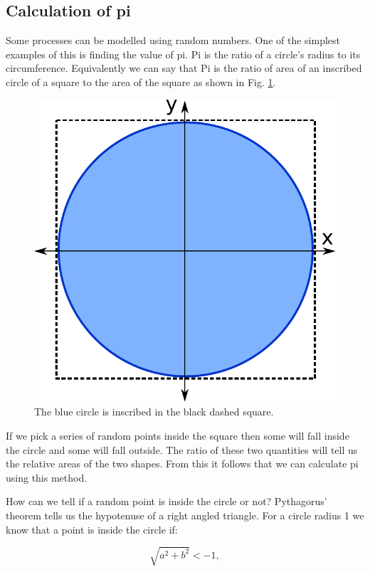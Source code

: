 	\subsection{Calculation of pi}
		Some processes can be modelled using random numbers. One of the simplest examples of this is finding the value of pi. Pi is the ratio of a circle's radius to its circumference. Equivalently we can say that Pi is the ratio of area of an inscribed circle of a square to the area of the square as shown in Fig. \ref{fig:picircle}. 
	\begin{figure}[h]
		\centering
		\includegraphics[scale=0.4]{images/pi}
		\caption{The blue circle is inscribed in the black dashed square.}
		\label{fig:picircle}
	\end{figure}

	If we pick a series of random points inside the square then some will fall inside the circle and some will fall outside. The ratio of these two quantities will tell us the relative areas of the two shapes. From this it follows that we can calculate pi using this method.

	How can we tell if a random point is inside the circle or not? Pythagorus' theorem tells us the hypotenuse of a right angled triangle. For a circle radius 1 we know that a point is inside the circle if:

	\begin{equation}
	\sqrt{a^2+b^2} <- 1,
	\end{equation}

